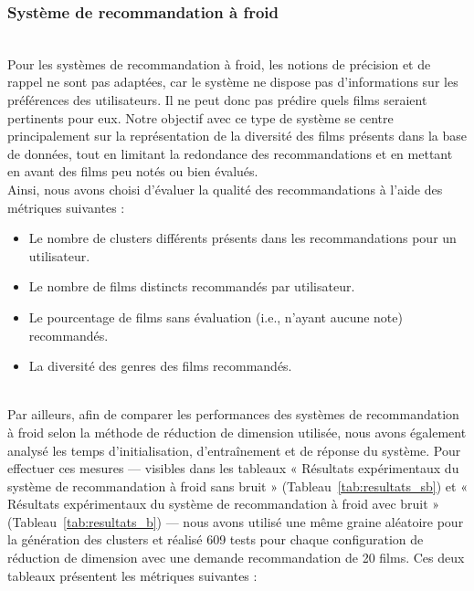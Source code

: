 \documentclass{article}
\begin{document}
\subsubsection{Système de recommandation à froid}
$ $\\
Pour les systèmes de recommandation à froid, les notions de précision et de rappel ne sont pas adaptées,
car le système ne dispose pas d'informations sur les préférences des utilisateurs. Il ne peut donc pas
prédire quels films seraient pertinents pour eux. Notre objectif avec ce type de système se centre principalement 
sur la représentation de la diversité des films présents dans la base de données, tout en limitant la
redondance des recommandations et en mettant en avant des films peu notés ou bien évalués.\\
Ainsi, nous avons choisi d'évaluer la qualité des recommandations à l'aide des métriques suivantes :\\
\begin{itemize}
    \item Le nombre de clusters différents présents dans les recommandations pour un utilisateur.
    \item Le nombre de films distincts recommandés par utilisateur.
    \item Le pourcentage de films sans évaluation (i.e., n'ayant aucune note) recommandés.
    \item La diversité des genres des films recommandés.
\end{itemize}
$ $\\
Par ailleurs, afin de comparer les performances des systèmes de recommandation à froid selon la méthode de
réduction de dimension utilisée, nous avons également analysé les temps d’initialisation, d’entraînement
et de réponse du système. Pour effectuer ces mesures — visibles dans les tableaux « Résultats expérimentaux
du système de recommandation à froid sans bruit » (Tableau~\ref{tab:resultats_sb}) et « Résultats expérimentaux
du système de recommandation à froid avec bruit » (Tableau~\ref{tab:resultats_b}) — nous avons utilisé une même
graine aléatoire pour la génération des clusters et réalisé 609 tests pour chaque configuration de réduction de dimension avec une demande recommandation de 20 films.
Ces deux tableaux présentent les métriques suivantes :\\
\end{document}

